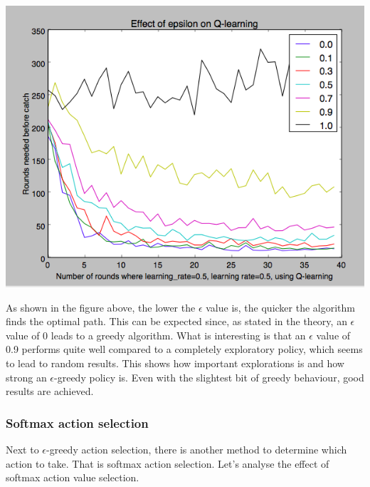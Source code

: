 \documentclass{article}
\begin{document}
\begin{center}
	\includegraphics[scale=0.4]{epsilons}
\end{center}

As shown in the figure above, the lower the $\epsilon$ value is, the quicker the algorithm finds the optimal path. This can be expected since, as stated in the theory, an $\epsilon$ value of 0 leads to a greedy algorithm. What is interesting is that an $\epsilon$ value of 0.9 performs quite well compared to a completely exploratory policy, which seems to lead to random results. This shows how important explorations is and how strong an $\epsilon$-greedy policy is. Even with the slightest bit of greedy behaviour, good results are achieved.

\subsubsection{Softmax action selection}
Next to $\epsilon$-greedy action selection, there is another method to determine which action to take. That is softmax action selection. Let's analyse the effect of softmax action value selection. 
\end{document}
